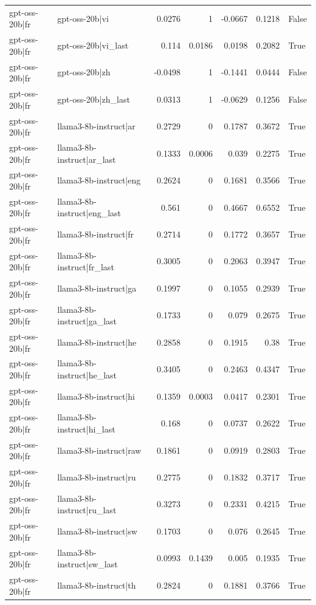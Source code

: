 \begin{table}
\begin{tabular}{l l r r r r l}
gpt-oss-20b|fr & gpt-oss-20b|vi & 0.0276 & 1 & -0.0667 & 0.1218 & False \\
gpt-oss-20b|fr & gpt-oss-20b|vi_last & 0.114 & 0.0186 & 0.0198 & 0.2082 & True \\
gpt-oss-20b|fr & gpt-oss-20b|zh & -0.0498 & 1 & -0.1441 & 0.0444 & False \\
gpt-oss-20b|fr & gpt-oss-20b|zh_last & 0.0313 & 1 & -0.0629 & 0.1256 & False \\
gpt-oss-20b|fr & llama3-8b-instruct|ar & 0.2729 & 0 & 0.1787 & 0.3672 & True \\
gpt-oss-20b|fr & llama3-8b-instruct|ar_last & 0.1333 & 0.0006 & 0.039 & 0.2275 & True \\
gpt-oss-20b|fr & llama3-8b-instruct|eng & 0.2624 & 0 & 0.1681 & 0.3566 & True \\
gpt-oss-20b|fr & llama3-8b-instruct|eng_last & 0.561 & 0 & 0.4667 & 0.6552 & True \\
gpt-oss-20b|fr & llama3-8b-instruct|fr & 0.2714 & 0 & 0.1772 & 0.3657 & True \\
gpt-oss-20b|fr & llama3-8b-instruct|fr_last & 0.3005 & 0 & 0.2063 & 0.3947 & True \\
gpt-oss-20b|fr & llama3-8b-instruct|ga & 0.1997 & 0 & 0.1055 & 0.2939 & True \\
gpt-oss-20b|fr & llama3-8b-instruct|ga_last & 0.1733 & 0 & 0.079 & 0.2675 & True \\
gpt-oss-20b|fr & llama3-8b-instruct|he & 0.2858 & 0 & 0.1915 & 0.38 & True \\
gpt-oss-20b|fr & llama3-8b-instruct|he_last & 0.3405 & 0 & 0.2463 & 0.4347 & True \\
gpt-oss-20b|fr & llama3-8b-instruct|hi & 0.1359 & 0.0003 & 0.0417 & 0.2301 & True \\
gpt-oss-20b|fr & llama3-8b-instruct|hi_last & 0.168 & 0 & 0.0737 & 0.2622 & True \\
gpt-oss-20b|fr & llama3-8b-instruct|raw & 0.1861 & 0 & 0.0919 & 0.2803 & True \\
gpt-oss-20b|fr & llama3-8b-instruct|ru & 0.2775 & 0 & 0.1832 & 0.3717 & True \\
gpt-oss-20b|fr & llama3-8b-instruct|ru_last & 0.3273 & 0 & 0.2331 & 0.4215 & True \\
gpt-oss-20b|fr & llama3-8b-instruct|sw & 0.1703 & 0 & 0.076 & 0.2645 & True \\
gpt-oss-20b|fr & llama3-8b-instruct|sw_last & 0.0993 & 0.1439 & 0.005 & 0.1935 & True \\
gpt-oss-20b|fr & llama3-8b-instruct|th & 0.2824 & 0 & 0.1881 & 0.3766 & True \\

\end{tabular}
\end{table}
